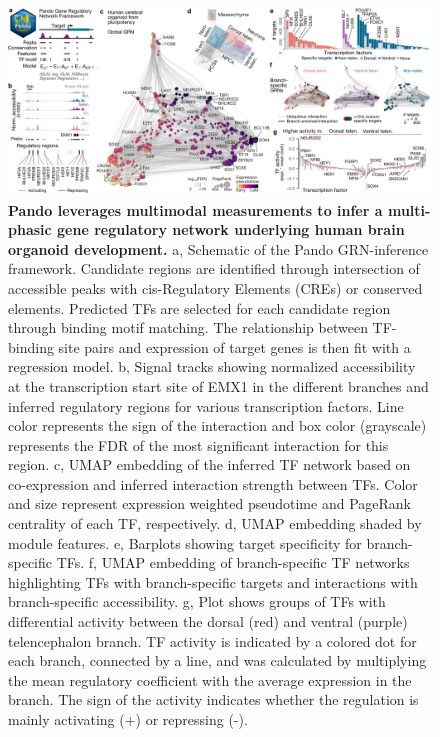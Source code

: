 \begin{figure}[t!]
    \centering
	\includegraphics[width=\textwidth]{figures/pando/Figure_2}
    \caption{\textbf{Pando leverages multimodal measurements to infer a multi-phasic gene regulatory network underlying human brain organoid development.}
    a, Schematic of the Pando GRN-inference framework. Candidate regions are identified through intersection of accessible peaks with cis-Regulatory Elements (CREs) or conserved elements. Predicted TFs are selected for each candidate region through binding motif matching. The relationship between TF-binding site pairs and expression of target genes is then fit with a regression model. b, Signal tracks showing normalized accessibility at the transcription start site of EMX1 in the different branches and inferred regulatory regions for various transcription factors. Line color represents the sign of the interaction and box color (grayscale) represents the FDR of the most significant interaction for this region. c, UMAP embedding of the inferred TF network based on co-expression and inferred interaction strength between TFs. Color and size represent expression weighted pseudotime and PageRank centrality of each TF, respectively. d, UMAP embedding shaded by module features. e, Barplots showing target specificity for branch-specific TFs. f, UMAP embedding of branch-specific TF networks highlighting TFs with branch-specific targets and interactions with branch-specific accessibility. g, Plot shows groups of TFs with differential activity between the dorsal (red) and ventral (purple) telencephalon branch. TF activity is indicated by a colored dot for each branch, connected by a line, and was calculated by multiplying the mean regulatory coefficient with the average expression in the branch. The sign of the activity indicates whether the regulation is mainly activating (+) or repressing (-).}
    \label{fig:reg2}
\end{figure}


